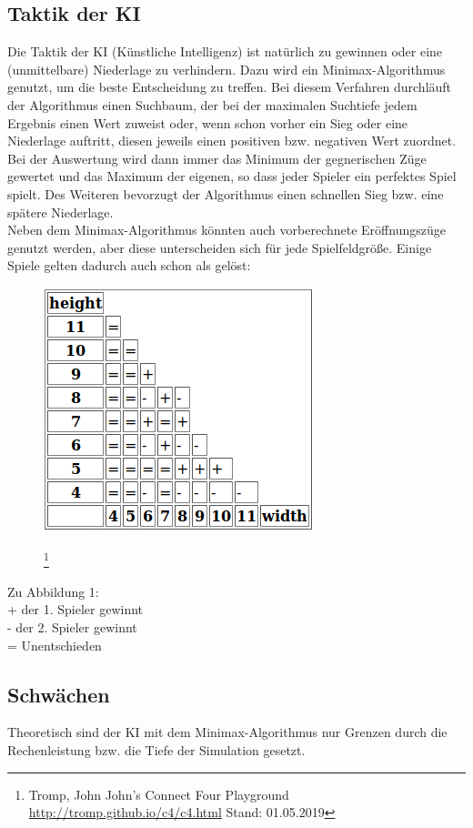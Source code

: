 \documentclass[12pt,a4paper,ngerman]{article}
\begin{document}
	\subsection{Taktik der KI}
	Die Taktik der KI (Künstliche Intelligenz) ist natürlich zu gewinnen oder eine (unmittelbare) Niederlage zu verhindern. Dazu wird ein Minimax-Algorithmus genutzt, um die beste Entscheidung zu treffen. Bei diesem Verfahren durchläuft der Algorithmus einen Suchbaum, der bei der maximalen Suchtiefe jedem Ergebnis einen Wert zuweist oder, wenn schon vorher ein Sieg oder eine Niederlage auftritt, diesen jeweils einen positiven bzw. negativen Wert zuordnet. Bei der Auswertung wird dann immer das Minimum der gegnerischen Züge gewertet und das Maximum der eigenen, so dass jeder Spieler ein \glqq perfektes \grqq{} Spiel spielt. Des Weiteren bevorzugt der Algorithmus einen schnellen Sieg bzw. eine spätere Niederlage.
		\\
	Neben dem Minimax-Algorithmus könnten auch vorberechnete Eröffnungszüge genutzt werden, aber diese unterscheiden sich für jede Spielfeldgröße. Einige Spiele gelten dadurch auch schon als gelöst:
	\begin{figure}[h]
		\centering
		\includegraphics[width=0.4\linewidth, height=0.3\textheight]{w-h-viergew}
		\caption{}
		\label{fig:w-h-viergew}
		\footnote{Tromp, John  \glqq John's Connect Four Playground \grqq{} \url{http://tromp.github.io/c4/c4.html} Stand: 01.05.2019}
	\end{figure}
    \newpage
	Zu Abbildung 1:\\
	+ der 1. Spieler gewinnt\\
	- der 2. Spieler gewinnt\\
	= Unentschieden\\
	
	
	
	\subsection{Schwächen}
	Theoretisch sind der KI mit dem Minimax-Algorithmus nur Grenzen durch die Rechenleistung bzw. die Tiefe der Simulation gesetzt.
	
\end{document}
